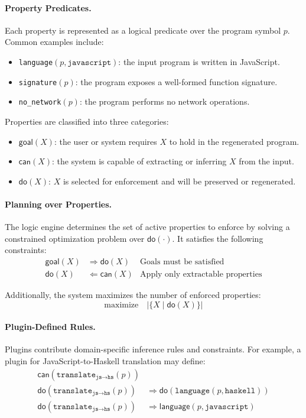 \documentclass[sigplan]{acmart}
\begin{document}
\paragraph{Property Predicates.}
Each property is represented as a logical predicate over the program symbol $p$. Common examples include:
\begin{itemize}
  \item \texttt{language}$(p, \texttt{javascript})$: the input program is written in JavaScript.
  \item \texttt{signature}$(p)$: the program exposes a well-formed function signature.
  \item \texttt{no\_network}$(p)$: the program performs no network operations.
\end{itemize}

Properties are classified into three categories:
\begin{itemize}
  \item $\mathsf{goal}(X)$: the user or system requires $X$ to hold in the regenerated program.
  \item $\mathsf{can}(X)$: the system is capable of extracting or inferring $X$ from the input.
  \item $\mathsf{do}(X)$: $X$ is selected for enforcement and will be preserved or regenerated.
\end{itemize}

\paragraph{Planning over Properties.}
The logic engine determines the set of active properties to enforce by solving a constrained optimization problem over $\mathsf{do}(\cdot)$. It satisfies the following constraints:
\begin{align*}
  \mathsf{goal}(X) &\Rightarrow \mathsf{do}(X) &\text{Goals must be satisfied} \\
  \mathsf{do}(X) &\Leftarrow \mathsf{can}(X) &\text{Apply only extractable properties}
\end{align*}

Additionally, the system maximizes the number of enforced properties: %
\[
\text{maximize} \quad |\{ X \mid \mathsf{do}(X) \}|
\]

\paragraph{Plugin-Defined Rules.}
Plugins contribute domain-specific inference rules and constraints. For example, a plugin for JavaScript-to-Haskell translation may define:
\begin{align*}
\mathsf{can}(\texttt{translate}_{\texttt{js} \rightarrow \texttt{hs}}(p)) & \\
\mathsf{do}(\texttt{translate}_{\texttt{js} \rightarrow \texttt{hs}}(p)) &\Rightarrow \mathsf{do}(\texttt{language}(p, \texttt{haskell})) \\
\mathsf{do}(\texttt{translate}_{\texttt{js} \rightarrow \texttt{hs}}(p)) &\Rightarrow \mathsf{language}(p, \texttt{javascript})
\end{align*}
\end{document}
